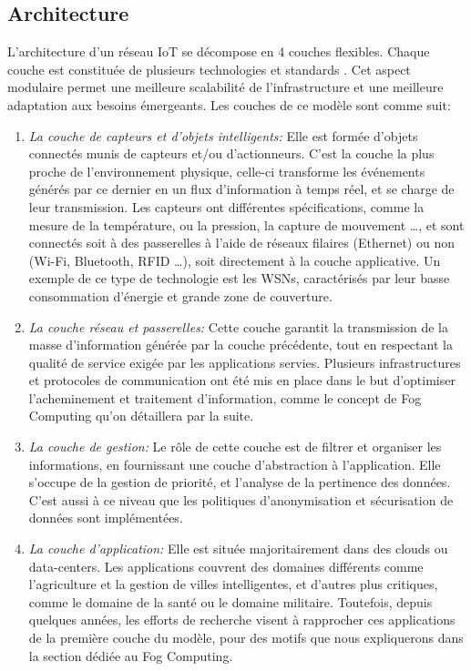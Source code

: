 \subsection{Architecture}
L'architecture d'un réseau IoT se décompose en 4 couches flexibles. Chaque couche est constituée de plusieurs technologies et standards \cite{patel2016}. Cet aspect modulaire permet une meilleure scalabilité de l'infrastructure et une meilleure adaptation aux besoins émergeants. Les couches de ce modèle sont comme suit:
\begin{enumerate}
  \item \emph{La couche de capteurs et d'objets intelligents:} Elle est formée d'objets connectés munis de capteurs et/ou d'actionneurs. C'est la couche la plus proche de l'environnement physique, celle-ci transforme les événements générés par ce dernier en un flux d'information à temps réel, et se charge de leur transmission. Les capteurs ont différentes spécifications, comme la mesure de la température, ou la pression, la capture de mouvement …, et sont connectés soit à des passerelles à l'aide de réseaux filaires (Ethernet) ou non (Wi-Fi, Bluetooth, RFID …), soit directement à la couche applicative. Un exemple de ce type de technologie est les WSNs, caractérisés par leur basse consommation d'énergie et grande zone de couverture.
  \item \emph{La couche réseau et passerelles:} Cette couche garantit la transmission de la masse d'information générée par la couche précédente, tout en respectant la qualité de service exigée par les applications servies. Plusieurs infrastructures et protocoles de communication ont été mis en place dans le but d'optimiser l'acheminement et traitement d'information, comme le concept de Fog Computing qu'on détaillera par la suite.
  \item \emph{La couche de gestion:} Le rôle de cette couche est de filtrer et organiser les informations, en fournissant une couche d'abstraction à l'application. Elle s'occupe de la gestion de priorité, et l'analyse de la pertinence des données. C'est aussi à ce niveau que les politiques d'anonymisation et sécurisation de données sont implémentées.
  \item \emph{La couche d'application:} Elle est située majoritairement dans des clouds ou data-centers. Les applications couvrent des domaines différents comme l'agriculture et la gestion de villes intelligentes, et d'autres plus critiques, comme le domaine de la santé ou le domaine militaire. Toutefois, depuis quelques années, les efforts de recherche visent à rapprocher ces applications de la première couche du modèle, pour des motifs que nous expliquerons dans la section dédiée au Fog Computing. 
\end{enumerate}

